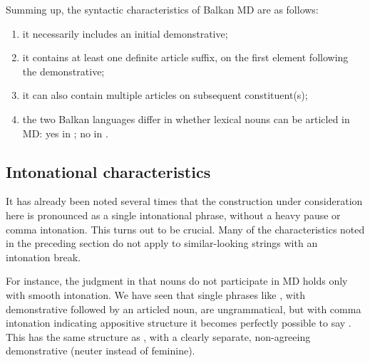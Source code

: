 \documentclass[output=paper,
colorlinks,
citecolor=brown,
newtxmath
]{langscibook}
\begin{document}
\noindent Summing up, the syntactic characteristics of Balkan  MD are as follows:
\begin{enumerate}
\item it necessarily includes an initial demonstrative;
\item it  contains at least one definite article suffix, on the first element following the demonstrative;
\item it can also contain multiple articles on subsequent constituent(s);
\item the two Balkan  languages differ in whether lexical nouns can be articled in MD: yes in ; no in .
\end{enumerate}

\subsection{Intonational characteristics} \label{sec:rudin:intonation}

It has already been noted several times that the construction under consideration here is pronounced as a single intonational phrase, without a heavy pause or comma intonation. This turns out to be crucial. Many of the characteristics noted in the preceding section do not apply to similar-looking strings with an intonation break.

For instance, the judgment in  that nouns do not participate in MD holds only with smooth intonation. We have seen that single phrases like , with demonstrative followed by an articled noun, are ungrammatical, but with comma intonation indicating appositive structure it becomes perfectly possible to say . This has the same structure as , with a clearly separate, non-agreeing demonstrative (neuter instead of feminine).

\z

\end{document}
